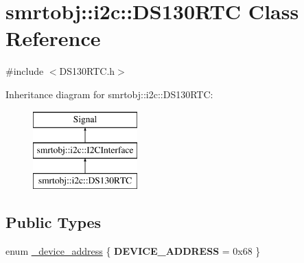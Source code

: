 \hypertarget{classsmrtobj_1_1i2c_1_1_d_s130_r_t_c}{}\section{smrtobj\+:\+:i2c\+:\+:D\+S130\+R\+T\+C Class Reference}
\label{classsmrtobj_1_1i2c_1_1_d_s130_r_t_c}


{\ttfamily \#include $<$D\+S130\+R\+T\+C.\+h$>$}

Inheritance diagram for smrtobj\+:\+:i2c\+:\+:D\+S130\+R\+T\+C\+:\begin{figure}[H]
\begin{center}
\leavevmode
\includegraphics[height=3.000000cm]{classsmrtobj_1_1i2c_1_1_d_s130_r_t_c}
\end{center}
\end{figure}
\subsection*{Public Types}
\begin{DoxyCompactItemize}
\item 
enum \hyperlink{classsmrtobj_1_1i2c_1_1_d_s130_r_t_c_abd82e4e74a39bcb7a637ba90fc7dcce9}{\+\_\+device\+\_\+address} \{ {\bfseries D\+E\+V\+I\+C\+E\+\_\+\+A\+D\+D\+R\+E\+S\+S} = 0x68
 \}
\end{DoxyCompactItemize}
